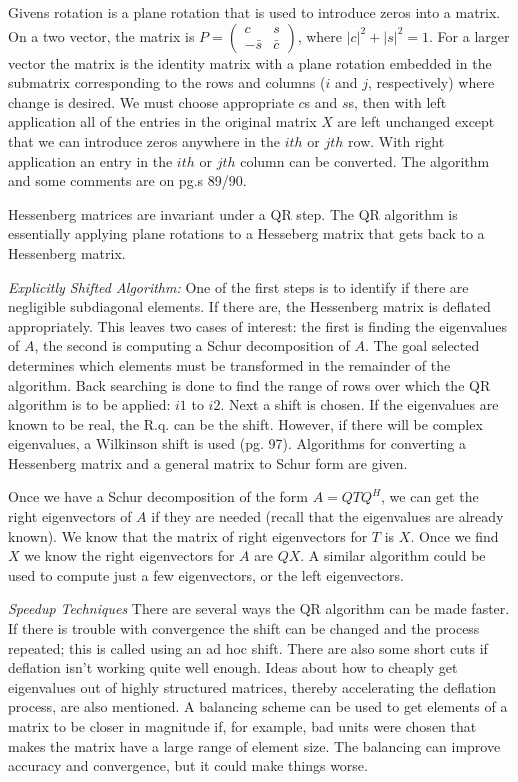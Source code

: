 \documentclass[12pt,twoside]{article}
\newcommand{\evalsl}{eigenvalues}
\newcommand{\evecsc}{eigenvectors}
\newcommand{\evals}{eigenvalues }
\newcommand{\evecs}{eigenvectors }
\begin{document}
Givens rotation is a plane rotation that is used to introduce zeros into a matrix. On a two vector, the matrix is $P = \begin{pmatrix} c & s \\ -\bar{s} & \bar{c} \end{pmatrix}$, where $|c|^2 + |s|^2 = 1$. For a larger vector the matrix is the identity matrix with a plane rotation embedded in the submatrix corresponding to the rows and columns ($i$ and $j$, respectively) where change is desired. We must choose appropriate $c$s and $s$s, then with left application all of the entries in the original matrix $X$ are left unchanged except that we can introduce zeros anywhere in the $ith$ or $jth$ row. With right application an entry in the $ith$ or $jth$ column can be converted. The algorithm and some comments are on pg.s 89/90. 

Hessenberg matrices are invariant under a QR step. The QR algorithm is essentially applying plane rotations to a Hesseberg matrix that gets back to a Hessenberg matrix. 

\emph{Explicitly Shifted Algorithm:}
One of the first steps is to identify if there are negligible subdiagonal elements. If there are, the Hessenberg matrix is deflated appropriately. This leaves two cases of interest: the first is finding the \evals of $A$, the second is computing a Schur decomposition of $A$. The goal selected determines which elements must be transformed in the remainder of the algorithm. Back searching is done to find the range of rows over which the QR algorithm is to be applied: $i1$ to $i2$. Next a shift is chosen. If the \evals are known to be real, the R.q. can be the shift. However, if there will be complex \evalsl, a Wilkinson shift is used (pg. 97). Algorithms for converting a Hessenberg matrix and a general matrix to Schur form are given.

Once we have a Schur decomposition of the form $A = QTQ^H$, we can get the right \evecs of $A$ if they are needed (recall that the \evals are already known). We know that the matrix of right \evecs for $T$ is $X$. Once we find $X$ we know the right \evecs for $A$ are $QX$. A similar algorithm could be used to compute just a few \evecsc, or the left \evecsc. 

\emph{Speedup Techniques}
There are several ways the QR algorithm can be made faster. If there is trouble with convergence the shift can be changed and the process repeated; this is called using an ad hoc shift. There are also some short cuts if deflation isn't working quite well enough. Ideas about how to cheaply get \evals out of highly structured matrices, thereby accelerating the deflation process, are also mentioned. A balancing scheme can be used to get elements of a matrix to be closer in magnitude if, for example, bad units were chosen that makes the matrix have a large range of element size. The balancing can improve accuracy and convergence, but it could make things worse. 
\end{document}
